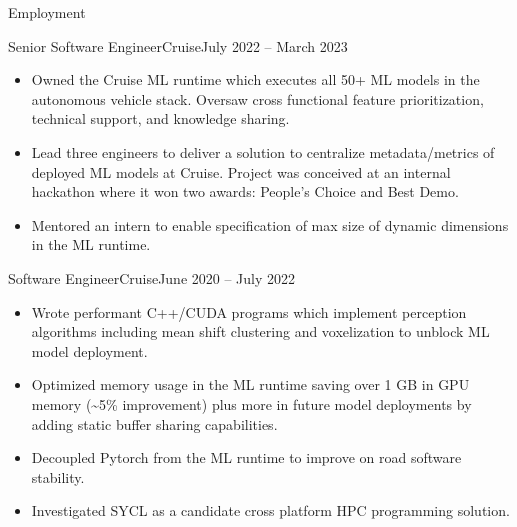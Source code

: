 \documentclass[termes]{resume}
\begin{document}
	\begin{cvsection}{Employment}
		\begin{cvsubsection}{Senior Software Engineer}{Cruise}{July 2022 -- March 2023}		
			\begin{itemize}
				\item Owned the Cruise ML runtime which executes all 50+ ML models in the autonomous vehicle stack. Oversaw cross functional feature prioritization, technical support, and knowledge sharing.
				\item Lead three engineers to deliver a solution to centralize metadata/metrics of deployed ML models at Cruise. Project was conceived at an internal hackathon where it won two awards: People's Choice and Best Demo.
				\item Mentored an intern to enable specification of max size of dynamic dimensions in the ML runtime.
			\end{itemize}
		\end{cvsubsection}
		
		\begin{cvsubsection}{Software Engineer}{Cruise}{June 2020 -- July 2022}		
			\begin{itemize}
				\item Wrote performant C++/CUDA programs which implement perception algorithms including mean shift clustering and voxelization to unblock ML model deployment.
				\item Optimized memory usage in the ML runtime saving over 1 GB in GPU memory (\sim5\% improvement) plus more in future model deployments by adding static buffer sharing capabilities.
 				\item Decoupled Pytorch from the ML runtime to improve on road software stability.
				\item Investigated SYCL as a candidate cross platform HPC programming solution.
			\end{itemize}
		\end{cvsubsection}
		

\end{cvsection}
\end{document}
